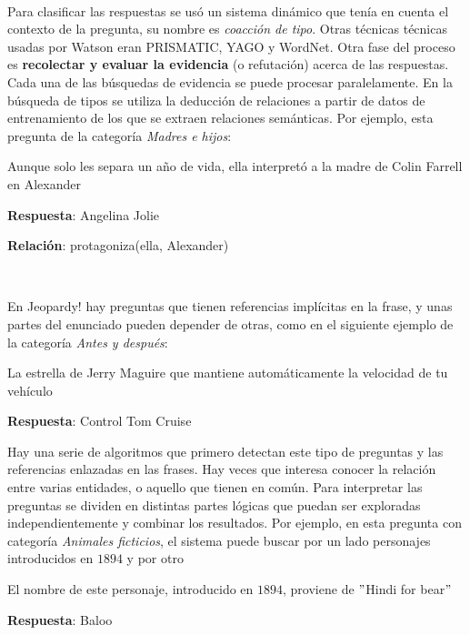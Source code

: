 \documentclass[paper=a4, fontsize=10pt]{scrartcl} %
\numberwithin{equation}{section} %
\numberwithin{figure}{section} %
\numberwithin{table}{section} %
\begin{document}
\

Para clasificar las respuestas se usó un sistema dinámico que tenía en cuenta el contexto de la pregunta, su nombre es \textit{coacción de tipo}. %
Otras técnicas técnicas usadas por Watson eran PRISMATIC, YAGO y WordNet. %
Otra fase del proceso es \textbf{recolectar y evaluar la evidencia} (o refutación) acerca de las respuestas. 
Cada una de las búsquedas de evidencia se puede procesar paralelamente.
En la búsqueda de tipos se utiliza la deducción de relaciones a partir de datos de entrenamiento de los que se extraen relaciones semánticas. Por ejemplo, esta pregunta de la categoría \textit{Madres e hijos}:

\begin{center}
Aunque solo les separa un año de vida, ella interpretó a la madre de Colin Farrell en Alexander

\textbf{Respuesta}: Angelina Jolie

\textbf{Relación}: protagoniza(ella, Alexander)
\end{center}

\

En Jeopardy! hay preguntas que tienen referencias implícitas en la frase, y unas partes del enunciado pueden depender de otras, como en el siguiente ejemplo de la categoría \textit{Antes y después}:

\begin{center}
La estrella de Jerry Maguire que mantiene automáticamente la velocidad de tu vehículo

\textbf{Respuesta}: Control Tom Cruise
\end{center} 

Hay una serie de algoritmos que primero detectan este tipo de preguntas y las referencias enlazadas en las frases.
Hay veces que interesa conocer la relación entre varias entidades, o aquello que tienen en común.
Para interpretar las preguntas se dividen en distintas partes lógicas que puedan ser exploradas independientemente y combinar los resultados. %
Por ejemplo, en esta pregunta con categoría \textit{Animales ficticios}, el sistema puede buscar por un lado personajes introducidos en $1894$ y por otro 

\begin{center}
El nombre de este personaje, introducido en $1894$, proviene de $"$Hindi for bear$"$

\textbf{Respuesta}: Baloo
\end{center}
\end{document}
